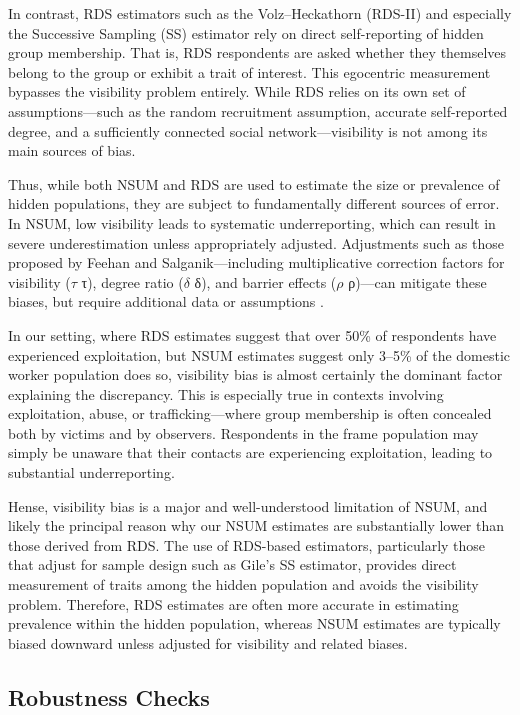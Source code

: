 \documentclass[
  12pt,
  letterpaper,
  DIV=11,
  numbers=noendperiod]{scrartcl}
\theoremstyle{plain}
\theoremstyle{definition}
\begin{document}
In contrast, RDS estimators such as the Volz--Heckathorn (RDS-II) and
especially the Successive Sampling (SS) estimator rely on direct
self-reporting of hidden group membership. That is, RDS respondents are
asked whether they themselves belong to the group or exhibit a trait of
interest. This egocentric measurement bypasses the visibility problem
entirely. While RDS relies on its own set of assumptions---such as the
random recruitment assumption, accurate self-reported degree, and a
sufficiently connected social network---visibility is not among its main
sources of bias.

Thus, while both NSUM and RDS are used to estimate the size or
prevalence of hidden populations, they are subject to fundamentally
different sources of error. In NSUM, low visibility leads to systematic
underreporting, which can result in severe underestimation unless
appropriately adjusted. Adjustments such as those proposed by Feehan and
Salganik---including multiplicative correction factors for visibility
(\(\tau\) τ), degree ratio (\(\delta\) δ), and barrier effects (\(\rho\)
ρ)---can mitigate these biases, but require additional data or
assumptions \autocite{feeh16-generalizing}.

In our setting, where RDS estimates suggest that over 50\% of
respondents have experienced exploitation, but NSUM estimates suggest
only 3--5\% of the domestic worker population does so, visibility bias
is almost certainly the dominant factor explaining the discrepancy. This
is especially true in contexts involving exploitation, abuse, or
trafficking---where group membership is often concealed both by victims
and by observers. Respondents in the frame population may simply be
unaware that their contacts are experiencing exploitation, leading to
substantial underreporting.

Hense, visibility bias is a major and well-understood limitation of
NSUM, and likely the principal reason why our NSUM estimates are
substantially lower than those derived from RDS. The use of RDS-based
estimators, particularly those that adjust for sample design such as
Gile's SS estimator, provides direct measurement of traits among the
hidden population and avoids the visibility problem. Therefore, RDS
estimates are often more accurate in estimating prevalence within the
hidden population, whereas NSUM estimates are typically biased downward
unless adjusted for visibility and related biases.

\subsection{Robustness Checks}\label{robustness-checks}
\end{document}
